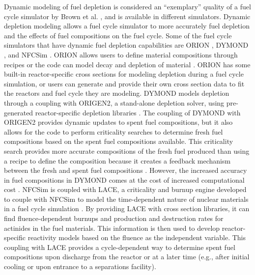 Dynamic modeling of fuel depletion is considered an ``exemplary'' quality 
of a fuel cycle simulator by Brown et al. \cite{brown_identification_2016},
and is available in different simulators. Dynamic depletion 
modeling allows a fuel cycle simulator to more accurately fuel depletion 
and the effects of fuel compositions on the fuel cycle. Some of the 
fuel cycle simulators that have dynamic fuel depletion capabilities 
are ORION \cite{feng_standardized_2016}, \gls{DYMOND} 
\cite{richards_application_2021}, and \gls{NFCSim} \cite{schneider_nfcsim:_2005}.
\gls{ORION} allows 
users to define material compositions through recipes or the code can 
model decay and depletion of material \cite{sunny_transition_2015}. ORION 
has some built-in reactor-specific cross sections for modeling 
depletion during a fuel cycle simulation, or users can generate 
and provide their own cross section data to fit the reactors and fuel cycle 
they are modeling. \gls{DYMOND} models depletion through a coupling with 
ORIGEN2, a stand-alone depletion solver, using pre-generated 
reactor-specific depletion libraries \cite{richards_application_2021}.
The coupling of \gls{DYMOND} with ORIGEN2 provides dynamic updates to 
spent fuel compositions, but it also allows for the code to perform 
criticality searches to determine fresh fuel compositions based on 
the spent fuel compositions available. This criticality search provides 
more accurate compositions of the fresh fuel produced than using a recipe 
to define the composition because it creates a feedback mechanism 
between the fresh and spent fuel compositions \cite{richards_application_2021}.
However, the increased accuracy in fuel compositions in \gls{DYMOND} comes 
at the cost of increased computational cost \cite{richards_application_2021}.
\gls{NFCSim} is coupled with \gls{LACE}, a criticality and burnup 
engine developed to couple with \gls{NFCSim} to model the 
time-dependent nature of nuclear materials in a fuel cycle simulation
\cite{schneider_nfcsim:_2005}. By providing \gls{LACE} with cross 
section libraries, it can find fluence-dependent burnups and production 
and destruction rates for actinides in the fuel materials. This 
information is then used to develop reactor-specific reactivity models 
based on the fluence as the independent variable. This coupling 
with \gls{LACE} provides a cycle-dependent way to determine 
spent fuel compositions upon discharge from the reactor or at a 
later time (e.g., after initial cooling or upon entrance to a 
separations facility). 


